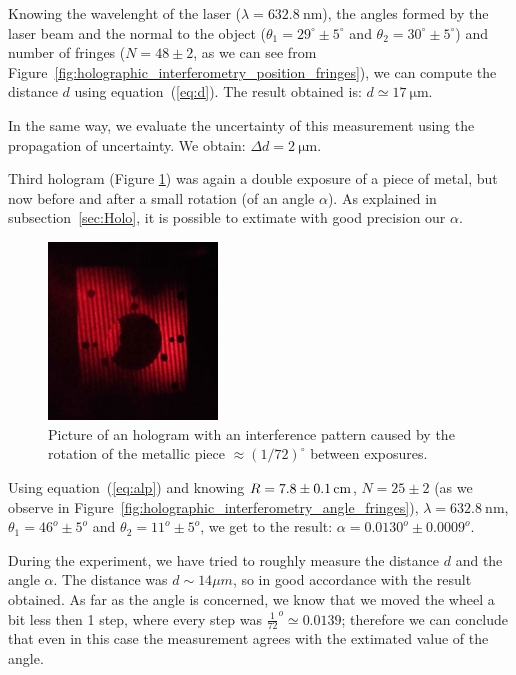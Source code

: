 \documentclass[11pt,a4paper]{article}
\begin{document}
Knowing the wavelenght of the laser ($\lambda=\SI{632.8}{\nano\m}$), the angles formed by the laser beam and the normal to the object ($\theta_1 =29^\circ \pm 5^\circ$ and $\theta_2 =30^\circ \pm 5^\circ$) and number of fringes ($N=48 \pm 2$, as we can see from Figure~\ref{fig:holographic_interferometry_position_fringes}), we can compute the distance $d$ using equation~(\ref{eq:d}). The result obtained is: $d \simeq \SI{17}{\micro\m}$.

In the same way, we evaluate the uncertainty of this measurement using the propagation of uncertainty. We obtain: $\Delta d=\SI{2}{\micro\m}$.

Third hologram (Figure \ref{fig:holographic_interferometry_angle}) was again a double exposure of a piece of metal, but now before and after a small rotation (of an angle $\alpha$). As explained in subsection~\ref{sec:Holo}, it is possible to extimate with good precision our $\alpha$.

\begin{figure}[ht]
\centering
\includegraphics[width=0.4\textwidth]{Holographic_interferometry_angle}
\caption{Picture of an hologram with an interference pattern caused by the rotation of the metallic piece $\approx (1/72)^\circ$ between exposures.}
\label{fig:holographic_interferometry_angle}
\end{figure}

Using equation~(\ref{eq:alp}) and knowing $R=\SI{7.8\pm0.1}{\cm}$, $N=25\pm 2$ (as we observe in Figure~\ref{fig:holographic_interferometry_angle_fringes}), $\lambda=\SI{632.8}{\nano\m}$, $\theta_1=46^o\pm 5^o$ and $\theta_2=11^o\pm 5^o$, we get to the result: $\alpha= 0.0130^o\pm 0.0009^o$.


During the experiment, we have tried to roughly measure the distance $d$ and the angle $\alpha$. The distance was $d\sim 14\mu m$, so in good accordance with the result obtained. As far as the angle is concerned, we know that we moved the wheel a bit less then 1 step, where every step was $\frac{1}{72}^o\simeq 0.0139$; therefore we can conclude that even in this case the measurement agrees with the extimated value of the angle.
\end{document}
